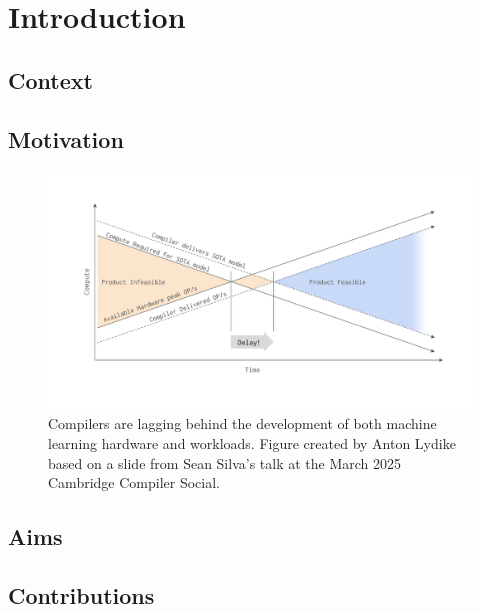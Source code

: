 \chapter{Introduction}
\label{chap:introduction}

%
%


\section{Context}
\label{sec:context}

\section{Motivation}
\label{sec:motivation}


\begin{figure}[H]
    \centering
    \includegraphics[width=\textwidth]{images/11_introduction/compilers_lagging.pdf}
    \caption{Compilers are lagging behind the development of both machine learning hardware and workloads. Figure created by Anton Lydike based on a slide from Sean Silva's talk at the March 2025 Cambridge Compiler Social.}
    \label{fig:compilers-lagging}
\end{figure}

\section{Aims}
\label{sec:aims}

\section{Contributions}
\label{sec:contributions}
